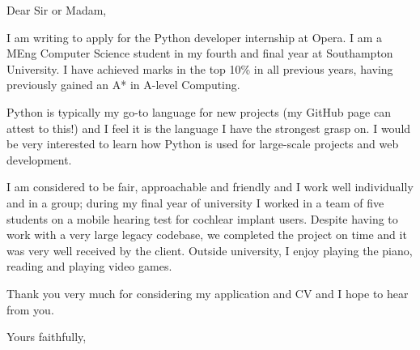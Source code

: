\documentclass[a4paper, margin=0.3in]{letter}
\begin{document}
\begin{letter}{}

\opening{Dear Sir or Madam,}

I am writing to apply for the Python developer internship at Opera. I am a MEng
Computer Science student in my fourth and final year at Southampton University.
I have achieved marks in the top 10\% in all previous years, having previously
gained an A* in A-level Computing.

Python is typically my go-to language for new projects (my GitHub page can
attest to this!) and I feel it is the language I have the strongest grasp on. I
would be very interested to learn how Python is used for large-scale projects
and web development.

I am considered to be fair, approachable and friendly and I work well
individually and in a group; during my final year of university I worked in a
team of five students on a mobile hearing test for cochlear implant users.
Despite having to work with a very large legacy codebase, we completed the
project on time and it was very well received by the client. Outside
university, I enjoy playing the piano, reading and playing video games.

Thank you very much for considering my application and CV and I hope to hear
from you.

\closing{Yours faithfully,}

\end{letter}
\end{document}
